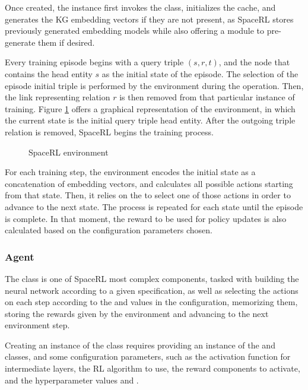 Once created, the  instance first invokes the  class, initializes the cache, and generates the KG embedding vectors if they are not present, as SpaceRL stores previously generated embedding models while also offering a module to pre-generate them if desired. 

Every training episode begins with a query triple $(s,r,t)$, and the node that contains the head entity $s$ as the initial state of the episode. The selection of the episode initial triple is performed by the environment during the  operation. Then, the link representing relation $r$ is then removed from that particular instance of training. Figure \ref{fig:environment} offers a graphical representation of the environment, in which the current state is the initial query triple head entity. 
After the outgoing triple relation is removed, SpaceRL begins the training process. 

\begin{figure}[!h]
    \centering
    
    \caption{SpaceRL environment}
    \label{fig:environment}
\end{figure}

For each training step, the environment encodes the initial state as a concatenation of embedding vectors, and calculates all possible actions starting from that state. Then, it relies on the  to select one of those actions in order to advance to the next state. The process is repeated for each state until the episode is complete. In that moment, the reward to be used for policy updates is also calculated based on the configuration parameters chosen.

\subsubsection{Agent}
The  class is one of SpaceRL most complex components, tasked with building the neural network according to a given specification, as well as selecting the actions on each step according to the  and  values in the configuration, memorizing them, storing the rewards given by the environment and advancing to the next environment step.

Creating an instance of the  class requires providing an instance of the  and  classes, and some configuration parameters, such as the activation function for intermediate layers, the RL algorithm to use, the reward components to activate, and the hyperparameter values  and .

